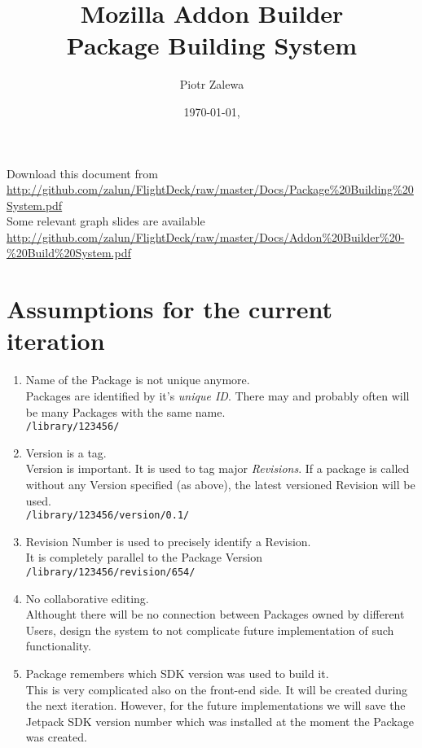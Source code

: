 \documentclass[10pt]{article}
\title{Mozilla Addon Builder\\ Package Building System}
\author{Piotr Zalewa}
\date{\today, \version}
\begin{document}
\maketitle

{\scriptsize
	\noindent Download this document from \\
\url{http://github.com/zalun/FlightDeck/raw/master/Docs/Package%20Building%20System.pdf}\\
}{\scriptsize
	\noindent Some relevant graph slides are available \\
	\url{http://github.com/zalun/FlightDeck/raw/master/Docs/Addon%20Builder%20-%20Build%20System.pdf}
}

\section{Assumptions for the current iteration}

	\begin{enumerate}
		\item{Name of the Package is not unique anymore.\\
			Packages are identified by it's {\em unique ID}. There may and probably often will be many
			Packages with the same name.\\
			{\tt /library/123456/}}
		\item{Version is a tag.\\
			Version is important. It is used to tag major {\em Revisions}. If a package is called without any
			Version specified (as above), the latest versioned Revision will be used.\\
			{\tt /library/123456/version/0.1/}}
		\item{Revision Number is used to precisely identify a Revision.\\
			It is completely parallel to the Package Version\\
			{\tt /library/123456/revision/654/}}
		\item{No collaborative editing.\\
			Althought there will be no connection between Packages owned by different Users, design the 
			system to not complicate future implementation of such functionality.}
		\item{Package remembers which SDK version was used to build it.\\
			This is very complicated also on the front-end side. It will be created during the next
			iteration. However, for the future implementations we will save the Jetpack SDK version number 
			which was installed at the moment the Package was created.}
	\end{enumerate}
\end{document}
